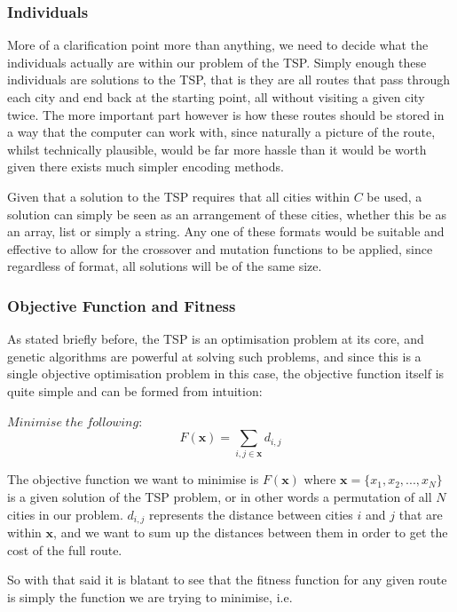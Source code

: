 \documentclass[11pt,a4paper,titlepage]{article}
\begin{document}
\subsubsection{Individuals}

More of a clarification point more than anything, we need to decide what the individuals actually are within our problem of the TSP. Simply enough these individuals are solutions to the TSP, that is they are all routes that pass through each city and end back at the starting point, all without visiting a given city twice. The more important part however is how these routes should be stored in a way that the computer can work with, since naturally a picture of the route, whilst technically plausible, would be far more hassle than it would be worth given there exists much simpler encoding methods.

Given that a solution to the TSP requires that all cities within $C$ be used, a solution can simply be seen as an arrangement of these cities, whether this be as an array, list or simply a string. Any one of these formats would be suitable and effective to allow for the crossover and mutation functions to be applied, since regardless of format, all solutions will be of the same size.

\subsubsection{Objective Function and Fitness}

As stated briefly before, the TSP is an optimisation problem at its core, and genetic algorithms are powerful at solving such problems, and since this is a single objective optimisation problem in this case, the objective function itself is quite simple and can be formed from intuition:


$Minimise\; the\; following:$ \[F(\mathbf{x}) = \sum_{i,j \in \mathbf{x}} d_{i,j} \]

The objective function we want to minimise is $F(\mathbf{x})$ where $\mathbf{x} = \{x_1, x_2, ..., x_N\}$ is a given solution of the TSP problem, or in other words a permutation of all $N$ cities in our problem. $d_{i,j}$ represents the distance between cities $i$ and $j$ that are within $\mathbf{x}$, and we want to sum up the distances between them in order to get the cost of the full route.

So with that said it is blatant to see that the fitness function for any given route is simply the function we are trying to minimise, i.e.
\end{document}
